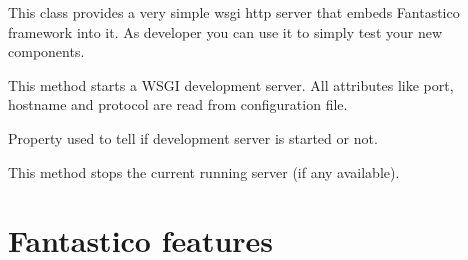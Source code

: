 \documentclass[letterpaper,10pt,english]{sphinxmanual}
\begin{document}
\begin{fulllineitems}
\label{get_started/dev_mode:fantastico.server.dev_server.DevServer}
This class provides a very simple wsgi http server that embeds Fantastico framework into it. As developer you can use
it to simply test your new components.

\begin{fulllineitems}
\label{get_started/dev_mode:fantastico.server.dev_server.DevServer.start}
This method starts a WSGI development server. All attributes like port, hostname and protocol are read from
configuration file.

\end{fulllineitems}


\begin{fulllineitems}
\label{get_started/dev_mode:fantastico.server.dev_server.DevServer.started}
Property used to tell if development server is started or not.

\end{fulllineitems}


\begin{fulllineitems}
\label{get_started/dev_mode:fantastico.server.dev_server.DevServer.stop}
This method stops the current running server (if any available).

\end{fulllineitems}


\end{fulllineitems}



\chapter{Fantastico features}
\label{features/features::doc}\label{features/features:fantastico-features}
\end{document}
